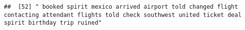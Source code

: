 \documentclass[
]{article}
\begin{document}
\begin{verbatim}
##  [52] " booked spirit mexico arrived airport told changed flight contacting attendant flights told check southwest united ticket deal spirit birthday trip ruined"                                                                                                                                                                                                                                                                                                                                                                                                                                                                                                                                                                                                                                                                                                                                                                                                                                                                                                                                                                                                                                                                                                                                                                                                                                                                                                                                                                                                                                                                                                                                                                                                                                    

\end{verbatim}
\end{document}
